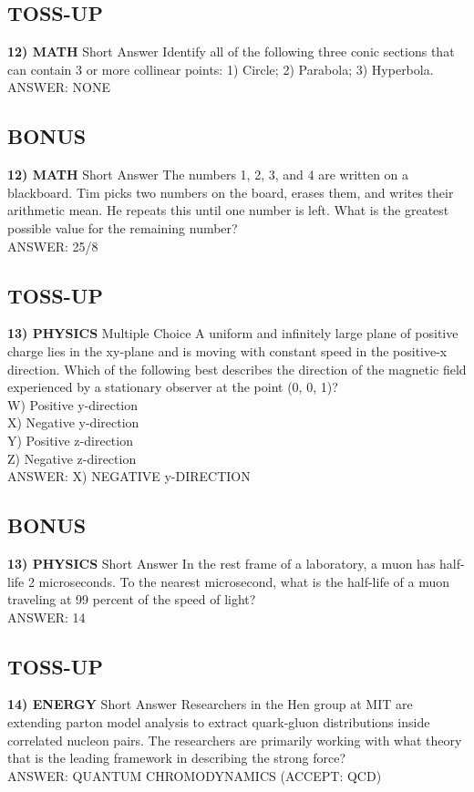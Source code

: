 \documentclass{article}
\begin{document}
\subsection*{TOSS-UP}
\textbf{12) MATH} Short Answer Identify all of the following three conic sections that can contain 3 or more collinear points: 1) Circle; 2) Parabola; 3) Hyperbola.
\\ANSWER: NONE

\subsection*{BONUS}
\textbf{12) MATH} Short Answer The numbers 1, 2, 3, and 4 are written on a blackboard. Tim picks two numbers on the board, erases them, and writes their arithmetic mean. He repeats this until one number is left. What is the greatest possible value for the remaining number?
\\ANSWER: 25/8

\subsection*{TOSS-UP}
\textbf{13) PHYSICS} Multiple Choice A uniform and infinitely large plane of positive charge lies in the xy-plane and is moving with constant speed in the positive-x direction. Which of the following best describes the direction of the magnetic field experienced by a stationary observer at the point (0, 0, 1)?
\\W) Positive y-direction
\\X) Negative y-direction
\\Y) Positive z-direction
\\Z) Negative z-direction
\\ANSWER: X) NEGATIVE y-DIRECTION

\subsection*{BONUS}
\textbf{13) PHYSICS} Short Answer In the rest frame of a laboratory, a muon has half-life 2 microseconds. To the nearest microsecond, what is the half-life of a muon traveling at 99 percent of the speed of light?
\\ANSWER: 14

\subsection*{TOSS-UP}
\textbf{14) ENERGY} Short Answer Researchers in the Hen group at MIT are extending parton model analysis to extract quark-gluon distributions inside correlated nucleon pairs. The researchers are primarily working with what theory that is the leading framework in describing the strong force?
\\ANSWER: QUANTUM CHROMODYNAMICS (ACCEPT: QCD)
\end{document}
